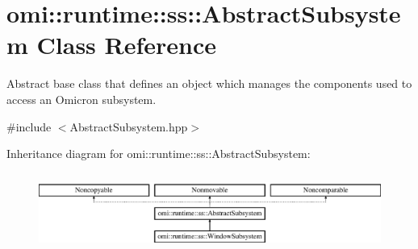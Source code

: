 \hypertarget{classomi_1_1runtime_1_1ss_1_1_abstract_subsystem}{}\section{omi\+:\+:runtime\+:\+:ss\+:\+:Abstract\+Subsystem Class Reference}
\label{classomi_1_1runtime_1_1ss_1_1_abstract_subsystem}


Abstract base class that defines an object which manages the components used to access an Omicron subsystem.  




{\ttfamily \#include $<$Abstract\+Subsystem.\+hpp$>$}

Inheritance diagram for omi\+:\+:runtime\+:\+:ss\+:\+:Abstract\+Subsystem\+:\begin{figure}[H]
\begin{center}
\leavevmode
\includegraphics[height=2.580645cm]{classomi_1_1runtime_1_1ss_1_1_abstract_subsystem}
\end{center}
\end{figure}
